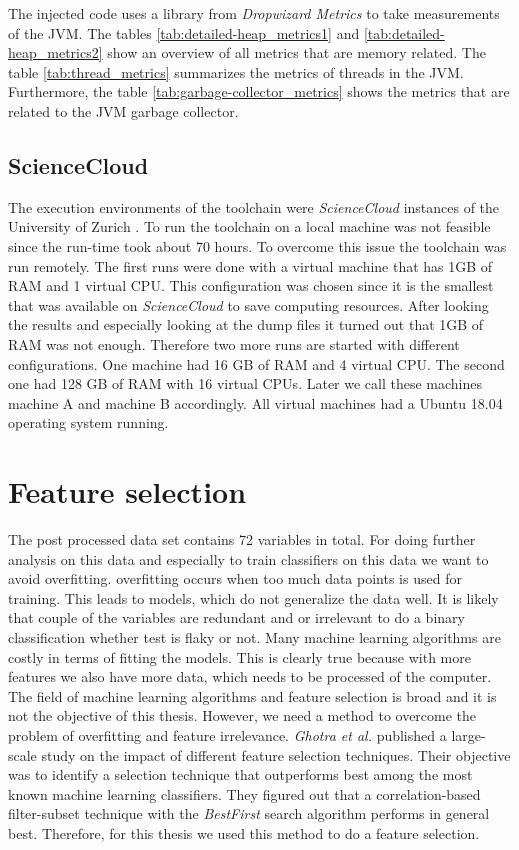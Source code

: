 \documentclass{seal_thesis}
\begin{document}
\noindent The injected code uses a library from \textit{Dropwizard Metrics} \cite{dropwizard} to take measurements of the JVM. The tables \ref{tab:detailed-heap_metrics1} and \ref{tab:detailed-heap_metrics2} show an overview of all metrics that are memory related. The table \ref{tab:thread_metrics} summarizes the metrics of threads in the JVM. Furthermore, the table \ref{tab:garbage-collector_metrics} shows the metrics that are related to the JVM garbage collector.




\subsection{ScienceCloud} \label{sec:science_cloud}
The execution environments of the toolchain were \textit{ScienceCloud} instances of the University of Zurich \cite{cloud}. To run the toolchain on a local machine was not feasible since the run-time took about 70 hours. To overcome this issue the toolchain was run remotely. The first runs were done with a virtual machine that has 1GB of RAM and 1 virtual CPU. This configuration was chosen since it is the smallest that was available on \textit{ScienceCloud} to save computing resources. After looking the results and especially looking at the dump files it turned out that 1GB of RAM was not enough. Therefore two more runs are started with different configurations. One machine had 16 GB of RAM and 4 virtual CPU. The second one had 128 GB of RAM with 16 virtual CPUs. Later we call these machines machine A and machine B accordingly. All virtual machines had a Ubuntu 18.04 operating system running.


\section{Feature selection} \label{sec:cfs}
The post processed data set contains 72 variables in total. For doing further analysis on this data and especially to train classifiers  on this data we want to avoid overfitting.  overfitting occurs when too much data points is used for training. This leads to models, which do not generalize the data well. It is likely that couple of the variables are redundant and or irrelevant to do a binary classification whether test is flaky or not. Many machine learning algorithms  are costly in terms of  fitting the models. This is clearly true because with more features we also have more data, which needs to be processed of the computer. The field of machine learning algorithms and feature selection is broad and it is not the objective of this thesis. However, we need a method to overcome the problem of overfitting and feature irrelevance. \textit{Ghotra et al.} \cite{ghotra17} published a large-scale study on the impact of different feature selection techniques. Their objective was to identify a  selection technique that outperforms best among  the most known machine learning classifiers. They figured out that a correlation-based filter-subset technique with the \textit{BestFirst} search algorithm performs in general best. Therefore, for this thesis we used this method to do a feature selection. \\
\end{document}
